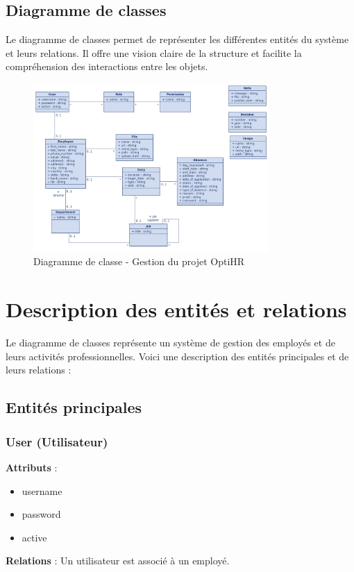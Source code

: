 \subsection{Diagramme de classes}
Le diagramme de classes permet de représenter les différentes entités du
système et leurs relations. Il offre une vision claire de la structure et
facilite la compréhension des interactions entre les objets.

\begin{figure}[H]
    \centering
    \includegraphics[width=0.8\textwidth]{images/diagrammes/class/diagramme.jpeg}
    \caption{Diagramme de classe - Gestion du projet OptiHR}
    \label{fig:class_diagramm_optiRH}
\end{figure}

\section{Description des entités et relations}

Le diagramme de classes représente un système de gestion des employés et de
leurs activités professionnelles. Voici une description des entités principales
et de leurs relations :

\subsection{Entités principales}

\subsubsection{User (Utilisateur)}
\textbf{Attributs} :
\begin{itemize}
    \item username
    \item password
    \item active
\end{itemize}
\textbf{Relations} : Un utilisateur est associé à un employé.

